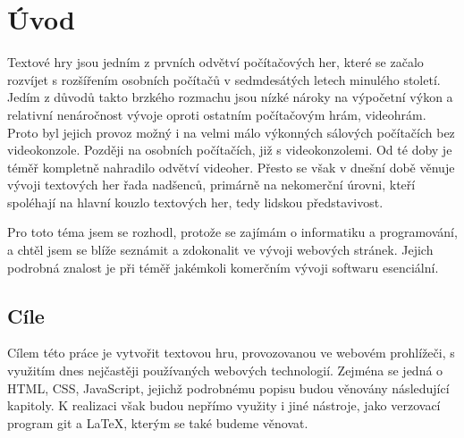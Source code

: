 \documentclass[main.tex]{subfiles}
\begin{document}
\section{Úvod}
Textové hry jsou jedním z prvních odvětví počítačových her, které se začalo rozvíjet s rozšířením osobních počítačů v sedmdesátých letech minulého století. Jedím z důvodů takto brzkého rozmachu jsou nízké nároky na výpočetní výkon a relativní nenáročnost vývoje oproti ostatním počítačovým hrám, videohrám. Proto byl jejich provoz možný i na velmi málo výkonných sálových počítačích bez videokonzole. Později na osobních počítačích, již s videokonzolemi. \cite{web:pcmag:en:oldcomputergames}
 Od té doby je téměř kompletně nahradilo odvětví videoher. Přesto se však v dnešní době věnuje vývoji textových her řada nadšenců, primárně na nekomerční úrovni, kteří spoléhají na hlavní kouzlo textových her, tedy lidskou představivost. \cite{web:wik:en:textgame}

Pro toto téma jsem se rozhodl, protože se zajímám o informatiku a programování, a chtěl jsem se blíže seznámit a zdokonalit ve vývoji webových stránek. Jejich podrobná znalost je při téměř jakémkoli komerčním vývoji softwaru esenciální.

\subsection{Cíle}
Cílem této práce je vytvořit textovou hru, provozovanou ve webovém prohlížeči, s využitím dnes nejčastěji používaných webových technologií. Zejména se jedná o HTML, CSS, JavaScript, jejichž podrobnému popisu budou věnovány následující kapitoly. K realizaci však budou nepřímo využity i jiné nástroje, jako verzovací program git a \LaTeX, kterým se také budeme věnovat.
\end{document}
